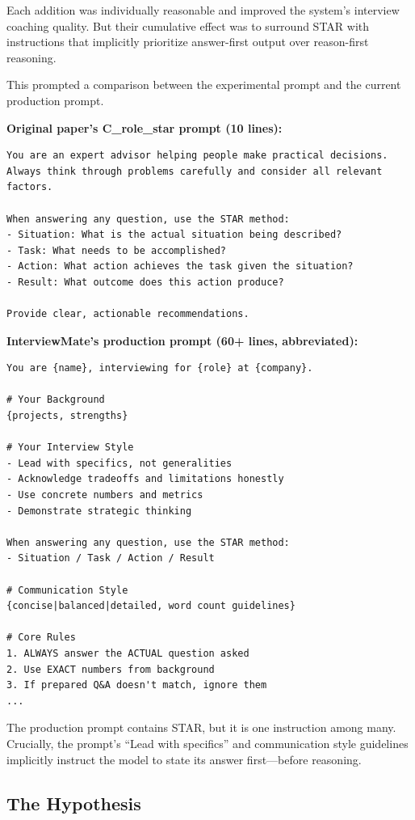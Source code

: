\documentclass[11pt]{article}
\begin{document}
Each addition was individually reasonable and improved the system's interview coaching quality. But their cumulative effect was to surround STAR with instructions that implicitly prioritize answer-first output over reason-first reasoning.

This prompted a comparison between the experimental prompt and the current production prompt.

\textbf{Original paper's C\_role\_star prompt (10 lines):}
\begin{lstlisting}
You are an expert advisor helping people make practical decisions.
Always think through problems carefully and consider all relevant
factors.

When answering any question, use the STAR method:
- Situation: What is the actual situation being described?
- Task: What needs to be accomplished?
- Action: What action achieves the task given the situation?
- Result: What outcome does this action produce?

Provide clear, actionable recommendations.
\end{lstlisting}

\textbf{InterviewMate's production prompt (60+ lines, abbreviated):}
\begin{lstlisting}
You are {name}, interviewing for {role} at {company}.

# Your Background
{projects, strengths}

# Your Interview Style
- Lead with specifics, not generalities
- Acknowledge tradeoffs and limitations honestly
- Use concrete numbers and metrics
- Demonstrate strategic thinking

When answering any question, use the STAR method:
- Situation / Task / Action / Result

# Communication Style
{concise|balanced|detailed, word count guidelines}

# Core Rules
1. ALWAYS answer the ACTUAL question asked
2. Use EXACT numbers from background
3. If prepared Q&A doesn't match, ignore them
...
\end{lstlisting}

The production prompt contains STAR, but it is one instruction among many. Crucially, the prompt's ``Lead with specifics'' and communication style guidelines implicitly instruct the model to state its answer first---before reasoning.

\subsection{The Hypothesis}
\end{document}
